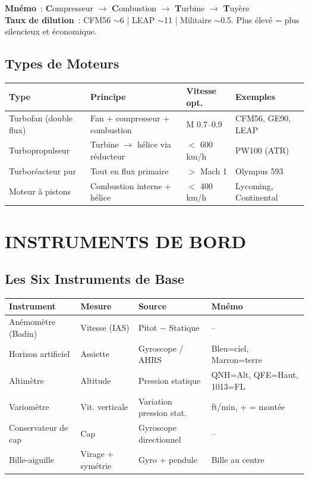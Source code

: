\documentclass[11pt,a4paper]{article}
\begin{document}
\begin{center}
\end{center}

\begin{memobox}
\textbf{Mnémo}~: \textbf{C}ompresseur $\to$ \textbf{C}ombustion $\to$ \textbf{T}urbine $\to$ \textbf{T}uyère\\
\textbf{Taux de dilution}~: CFM56 $\sim$6 | LEAP $\sim$11 | Militaire $\sim$0.5. Plus élevé = plus silencieux et économique.
\end{memobox}

\subsection{Types de Moteurs}

\begin{tabular}{p{3.5cm}p{5cm}p{2.5cm}p{3cm}}
\toprule
\textbf{Type} & \textbf{Principe} & \textbf{Vitesse opt.} & \textbf{Exemples} \\
\midrule
Turbofan (double flux) & Fan + compresseur + combustion & M 0.7--0.9 & CFM56, GE90, LEAP \\
Turbopropulseur & Turbine $\to$ hélice via réducteur & $<$ 600 km/h & PW100 (ATR) \\
Turboréacteur pur & Tout en flux primaire & $>$ Mach 1 & Olympus 593 \\
Moteur à pistons & Combustion interne + hélice & $<$ 400 km/h & Lycoming, Continental \\
\bottomrule
\end{tabular}

\section{INSTRUMENTS DE BORD}

\subsection{Les Six Instruments de Base}

\begin{tabular}{p{3cm}p{3cm}p{4cm}p{4.5cm}}
\toprule
\textbf{Instrument} & \textbf{Mesure} & \textbf{Source} & \textbf{Mnémo} \\
\midrule
Anémomètre (Badin) & Vitesse (IAS) & Pitot $-$ Statique & -- \\
Horizon artificiel & Assiette & Gyroscope / AHRS & Bleu=ciel, Marron=terre \\
Altimètre & Altitude & Pression statique & QNH=Alt, QFE=Haut, 1013=FL \\
Variomètre & Vit. verticale & Variation pression stat. & ft/min, + = montée \\
Conservateur de cap & Cap & Gyroscope directionnel & -- \\
Bille-aiguille & Virage + symétrie & Gyro + pendule & Bille au centre \\
\bottomrule
\end{tabular}
\end{document}
